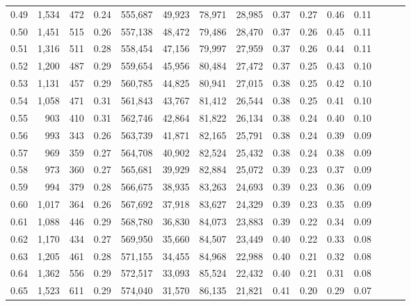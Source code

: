 \begin{tabular}{rrrrrrrrrrrrrrr}
0.49 &   1,534 &    472 &  0.24 &  555,687 &   49,923 &   78,971 &   28,985 &  0.37 &  0.27 &  0.46 &      0.11 \\
0.50 &   1,451 &    515 &  0.26 &  557,138 &   48,472 &   79,486 &   28,470 &  0.37 &  0.26 &  0.45 &      0.11 \\
0.51 &   1,316 &    511 &  0.28 &  558,454 &   47,156 &   79,997 &   27,959 &  0.37 &  0.26 &  0.44 &      0.11 \\
0.52 &   1,200 &    487 &  0.29 &  559,654 &   45,956 &   80,484 &   27,472 &  0.37 &  0.25 &  0.43 &      0.10 \\
0.53 &   1,131 &    457 &  0.29 &  560,785 &   44,825 &   80,941 &   27,015 &  0.38 &  0.25 &  0.42 &      0.10 \\
0.54 &   1,058 &    471 &  0.31 &  561,843 &   43,767 &   81,412 &   26,544 &  0.38 &  0.25 &  0.41 &      0.10 \\
0.55 &     903 &    410 &  0.31 &  562,746 &   42,864 &   81,822 &   26,134 &  0.38 &  0.24 &  0.40 &      0.10 \\
0.56 &     993 &    343 &  0.26 &  563,739 &   41,871 &   82,165 &   25,791 &  0.38 &  0.24 &  0.39 &      0.09 \\
0.57 &     969 &    359 &  0.27 &  564,708 &   40,902 &   82,524 &   25,432 &  0.38 &  0.24 &  0.38 &      0.09 \\
0.58 &     973 &    360 &  0.27 &  565,681 &   39,929 &   82,884 &   25,072 &  0.39 &  0.23 &  0.37 &      0.09 \\
0.59 &     994 &    379 &  0.28 &  566,675 &   38,935 &   83,263 &   24,693 &  0.39 &  0.23 &  0.36 &      0.09 \\
0.60 &   1,017 &    364 &  0.26 &  567,692 &   37,918 &   83,627 &   24,329 &  0.39 &  0.23 &  0.35 &      0.09 \\
0.61 &   1,088 &    446 &  0.29 &  568,780 &   36,830 &   84,073 &   23,883 &  0.39 &  0.22 &  0.34 &      0.09 \\
0.62 &   1,170 &    434 &  0.27 &  569,950 &   35,660 &   84,507 &   23,449 &  0.40 &  0.22 &  0.33 &      0.08 \\
0.63 &   1,205 &    461 &  0.28 &  571,155 &   34,455 &   84,968 &   22,988 &  0.40 &  0.21 &  0.32 &      0.08 \\
0.64 &   1,362 &    556 &  0.29 &  572,517 &   33,093 &   85,524 &   22,432 &  0.40 &  0.21 &  0.31 &      0.08 \\
0.65 &   1,523 &    611 &  0.29 &  574,040 &   31,570 &   86,135 &   21,821 &  0.41 &  0.20 &  0.29 &      0.07 \\

\end{tabular}
